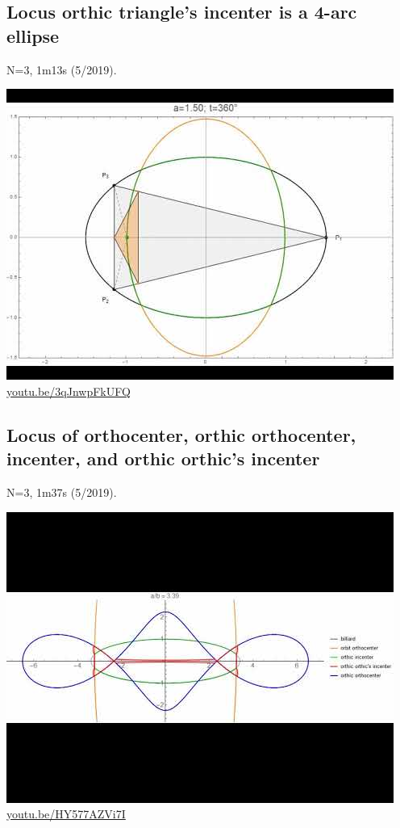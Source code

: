 \documentclass[12pt]{amsart}
\begin{document}
\subsection{Locus orthic triangle's incenter is a 4-arc ellipse}
\label{vid:3qJnwpFkUFQ}
\noindent N=3, 1m13s (5/2019). 
\begin{center}\includegraphics[width=.5\textwidth]{pics/3qJnwpFkUFQ.jpg} \\ 
\href{https://youtu.be/3qJnwpFkUFQ}{\url{youtu.be/3qJnwpFkUFQ}}\end{center}
% 

\subsection{Locus of orthocenter, orthic orthocenter, incenter, and orthic orthic's incenter}
\label{vid:HY577AZVi7I}
\noindent N=3, 1m37s (5/2019). 
\begin{center}\includegraphics[width=.5\textwidth]{pics/HY577AZVi7I.jpg} \\ 
\href{https://youtu.be/HY577AZVi7I}{\url{youtu.be/HY577AZVi7I}}\end{center}
% 
\end{document}
